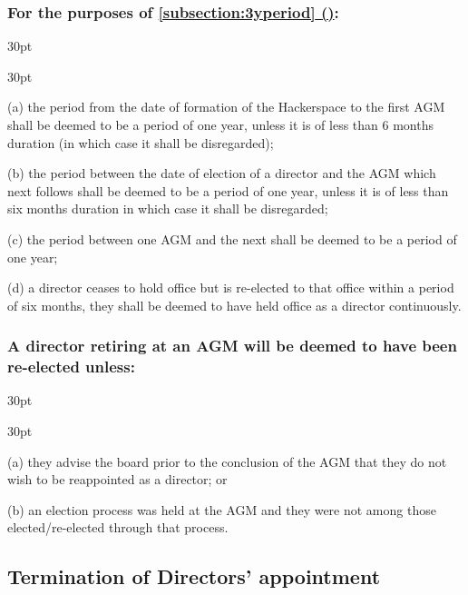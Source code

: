 \documentclass[12pt]{article}
\newcommand*{\fancyref}[1]{\hyperref[{#1}]{\autoref*{#1} (\nameref*{#1})}}
\def\clauseindent{30pt}
\newenvironment{subindentlist}{\begin{adjustwidth}{\clauseindent}{}\begin{labeledlist}{\clauseindent}}{\end{labeledlist}\end{adjustwidth}}
\begin{document}
\subsubsection{For the purposes of \fancyref{subsection:3yperiod}:}
\begin{subindentlist}
    \item [(a)] the period from the date of formation of the Hackerspace to the first AGM shall be deemed to be a period of one year, unless it is of less than 6 months duration (in which case it shall be disregarded);
    \item [(b)] the period between the date of election of a director and the AGM which next follows shall be deemed to be a period of one year, unless it is of less than six months duration in which case it shall be disregarded;
    \item [(c)] the period between one AGM and the next shall be deemed to be a period of one year;
    \item [(d)] a director ceases to hold office but is re-elected to that office within a period of six months, they shall be deemed to have held office as a director continuously.
\end{subindentlist}
\subsubsection{A director retiring at an AGM will be deemed to have been re-elected unless:}
\begin{subindentlist}
    \item [(a)] they advise the board prior to the conclusion of the AGM that they do not wish to
be reappointed as a director; or
    \item [(b)] an election process was held at the AGM and they were not among those elected/re-elected through that process.
\end{subindentlist}

\subsection{Termination of Directors' appointment}
\end{document}
